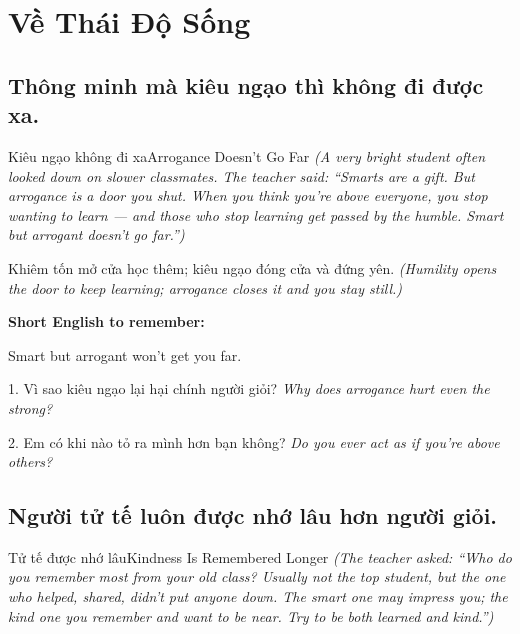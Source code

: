 \chapter{Về Thái Độ Sống}

\section{Thông minh mà kiêu ngạo thì không đi được xa.}
\begin{truyen}{Kiêu ngạo không đi xa}{Arrogance Doesn't Go Far}
\textit{(A very bright student often looked down on slower classmates. The teacher said: ``Smarts are a gift. But arrogance is a door you shut. When you think you're above everyone, you stop wanting to learn — and those who stop learning get passed by the humble. Smart but arrogant doesn't go far.'')}
\end{truyen}

\begin{baihoc}
Khiêm tốn mở cửa học thêm; kiêu ngạo đóng cửa và đứng yên.
\textit{(Humility opens the door to keep learning; arrogance closes it and you stay still.)}
\end{baihoc}

\begin{ghinhoanh}
\textbf{Short English to remember:}

Smart but arrogant won't get you far.

\end{ghinhoanh}

\begin{tuhocnhanh}
1. Vì sao kiêu ngạo lại hại chính người giỏi? \textit{Why does arrogance hurt even the strong?}

2. Em có khi nào tỏ ra mình hơn bạn không? \textit{Do you ever act as if you're above others?}
\end{tuhocnhanh}
\ngancach

\section{Người tử tế luôn được nhớ lâu hơn người giỏi.}
\begin{truyen}{Tử tế được nhớ lâu}{Kindness Is Remembered Longer}
\textit{(The teacher asked: ``Who do you remember most from your old class? Usually not the top student, but the one who helped, shared, didn't put anyone down. The smart one may impress you; the kind one you remember and want to be near. Try to be both learned and kind.'')}
\end{truyen}

